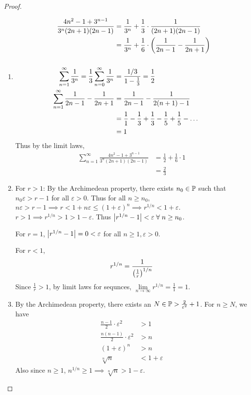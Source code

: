 \documentclass[12pt]{article}
\begin{document}
\begin{proof} \leavevmode
    \begin{enumerate}[label=(\alph*)]
        \item
        \begin{align*}
            \frac{4n^{2} - 1 + 3^{n-1}}{3^{n} (2n + 1)(2n - 1)} &= \frac{1}{3^{n}} + \frac{1}{3} \cdot \frac{1}{(2n + 1)(2n - 1)} \\
            &= \frac{1}{3^{n}} + \frac{1}{6} \cdot \paren{\frac{1}{2n-1} - \frac{1}{2n+1}} \\
            \\
            \sum_{n=1}^{\infty} \frac{1}{3^{n}} = \frac{1}{3} \sum_{n=0}^{\infty} \frac{1}{3^{n}} &= \frac{1 / 3}{1-\frac{1}{3}} = \frac{1}{2} \\
            \sum_{n=1}^{\infty} \frac{1}{2n-1} - \frac{1}{2n+1} &= \frac{1}{2n-1} - \frac{1}{2(n+1) - 1} \\
            &= \frac{1}{1} - \frac{1}{3} + \frac{1}{3} - \frac{1}{5} + \frac{1}{5} - \dots \\
            &= 1
        \end{align*}
        Thus by the limit laws,
        \begin{align*}
            \sum_{n=1}^{\infty} \frac{4n^{2} - 1 + 3^{n-1}}{3^{n} (2n + 1)(2n - 1)} &= \frac{1}{2} + \frac{1}{6} \cdot 1 \\
            &= \frac{2}{3}
        \end{align*}
        \item For $r > 1$: By the Archimedean property, there exists $n_{0} \in \P$ such that $n_{0} \varepsilon > r - 1$ for all $\varepsilon > 0$.
        Thus for all $n \geq n_{0}$, $n \varepsilon > r - 1 \implies r < 1 + n \varepsilon \leq (1 + \varepsilon)^{n} \implies r^{1/n} < 1 + \varepsilon$.
        $r > 1 \implies r^{1/n} > 1 > 1 - \varepsilon$.
        Thus $\abs{r^{1 / n} - 1} < \varepsilon \;\forall\; n \geq n_{0}$.

        For $r = 1$, $\abs{r^{1/n} - 1} = 0 < \varepsilon$ for all $n \geq  1, \varepsilon > 0$.

        For $r < 1$, \[
            r^{1/n} = \frac{1}{\paren{\frac{1}{r}}^{1/n}}
        \] Since $\frac{1}{r} > 1$, by limit laws for sequnces, $\lim\limits_{n \to \infty} r^{1/n} = \frac{1}{1} = 1$.
        
        \item By the Archimedean property, there exists an $N \in \P > \frac{2}{\varepsilon^{2}} + 1$. For $n \geq N$, we have
        \begin{align*}
            \frac{n - 1}{2} \cdot \varepsilon^{2} &> 1 \\
            \frac{n(n - 1)}{2} \cdot \varepsilon^{2} &> n \\
            (1 + \varepsilon)^{n} &> n \\
            \sqrt[n]{n} &< 1 + \varepsilon
        \end{align*}
        Also since $n \geq 1$, $n^{1 / n} \geq 1 \implies \sqrt[n]{n} > 1 - \varepsilon$. \qedhere
    \end{enumerate}
\end{proof}
\end{document}
